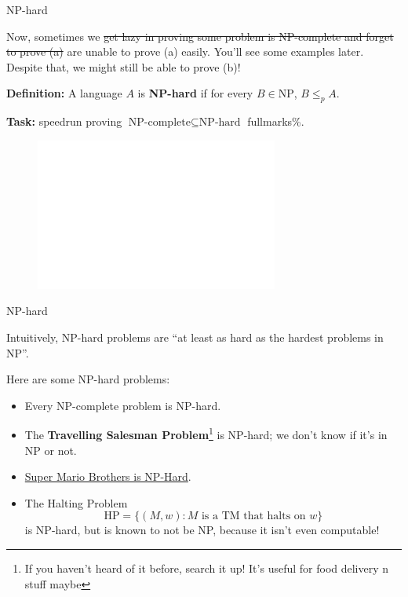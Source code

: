 \documentclass{beamer}
\begin{document}
\begin{frame}{NP-hard \emojiflushed}

Now, sometimes we \sout{get lazy in proving some problem is NP-complete and forget to prove (a)} are unable to prove (a) easily. You'll see some examples later. Despite that, we might still be able to prove (b)! 

\vspace{2mm}

\textbf{Definition:} A language $A$ is \textbf{NP-hard} if for every $B \in \text{NP}$, $B \leq_p A$.

\vspace{2mm}

\textbf{Task:} speedrun proving $\text{NP-complete} \subseteq \text{NP-hard}$ fullmarks\%. 

\begin{figure}[h]
\centering
\includegraphics[height=5cm]{img/thank_wikipedia.png}
\end{figure}


\end{frame}

\begin{frame}{NP-hard \emojiflushed}

Intuitively, NP-hard problems are ``at least as hard as the hardest problems in NP''.

\vspace{2mm}

Here are some NP-hard problems:
\begin{itemize}
\item Every NP-complete problem is NP-hard.
\item The \textbf{Travelling Salesman Problem}\footnote{If you haven't heard of it before, search it up! It's useful for food delivery n stuff maybe \emojisushi} is NP-hard; we don't know if it's in NP or not. 
\item \href{https://www.csail.mit.edu/news/super-mario-brothers-isnt-just-hard-its-np-hard}{Super Mario Brothers is NP-Hard}.
\item The Halting Problem 
$$\text{HP} = \{(M, w): \text{$M$ is a TM that halts on $w$}\}$$
is NP-hard, but is known to not be NP, because it isn't even computable!
\end{itemize}

\end{frame}
\end{document}
